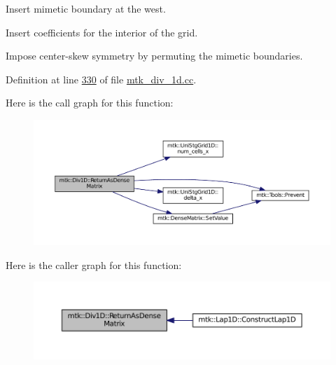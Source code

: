 \begin{DoxyEnumerate}
\item Insert mimetic boundary at the west.
\item Insert coefficients for the interior of the grid.
\item Impose center-\/skew symmetry by permuting the mimetic boundaries. 
\end{DoxyEnumerate}

Definition at line \hyperlink{mtk__div__1d_8cc_source_l00330}{330} of file \hyperlink{mtk__div__1d_8cc_source}{mtk\-\_\-div\-\_\-1d.\-cc}.



Here is the call graph for this function\-:\nopagebreak
\begin{figure}[H]
\begin{center}
\leavevmode
\includegraphics[width=350pt]{classmtk_1_1Div1D_afdbb1e11f05dd77b882f36426229acf7_cgraph}
\end{center}
\end{figure}




Here is the caller graph for this function\-:\nopagebreak
\begin{figure}[H]
\begin{center}
\leavevmode
\includegraphics[width=350pt]{classmtk_1_1Div1D_afdbb1e11f05dd77b882f36426229acf7_icgraph}
\end{center}
\end{figure}



